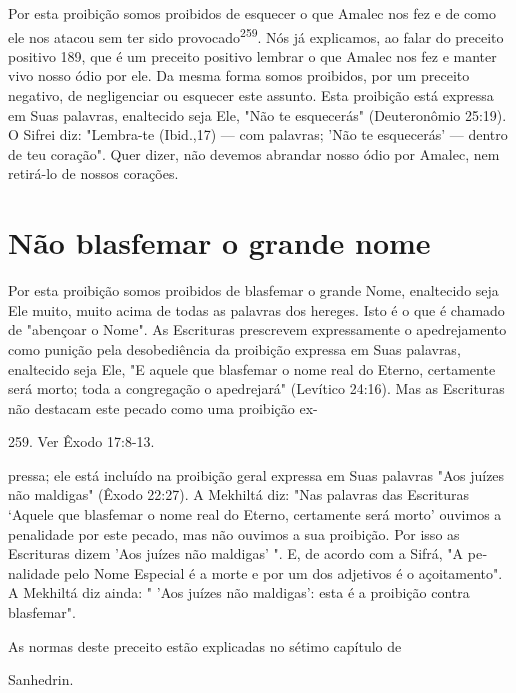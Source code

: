 \begin{itemize}
\begin{enumrate}
\begin{itemize}
\begin{itemize}
\begin{itemize}
Por esta proibição somos proibidos de esquecer o que Amalec nos fez e de
como ele nos atacou sem ter sido provocado\textsuperscript{259}. Nós já
explicamos, ao falar do preceito positivo 189, que é um preceito
positivo lembrar o que Amalec nos fez e manter vivo nosso ódio por ele.
Da mesma forma somos proi­bidos, por um preceito negativo, de
negligenciar ou esquecer este assunto. Es­ta proibição está expressa em
Suas palavras, enaltecido seja Ele, "Não te esque­cerás" (Deuteronômio
25:19). O Sifrei diz: "Lembra-te (Ibid.,17) --- com pala­vras; 'Não te
esquecerás' --- dentro de teu coração". Quer dizer, não devemos abrandar
nosso ódio por Amalec, nem retirá-lo de nossos corações.


\section{Não blasfemar o grande nome}


Por esta proibição somos proibidos de blasfemar o grande Nome,
enaltecido seja Ele muito, muito acima de todas as palavras dos hereges.
Isto é o que é chamado de "abençoar o Nome". As Escrituras prescrevem
expressa­mente o apedrejamento como punição pela desobediência da
proibição expressa em Suas palavras, enaltecido seja Ele, "E aquele que
blasfemar o nome real do Eterno, certamente será morto; toda a
congregação o apedrejará" (Levítico 24:16). Mas as Escrituras não
destacam este pecado como uma proibição ex-

259. Ver Êxodo 17:8-13.

pressa; ele está incluído na proibição geral expressa em Suas palavras
"Aos juí­zes não maldigas" (Êxodo 22:27). A Mekhiltá diz: "Nas palavras
das Escrituras `Aquele que blasfemar o nome real do Eterno, certamente
será morto' ouvimos a penalidade por este pecado, mas não ouvimos a sua
proibição. Por isso as Escrituras dizem 'Aos juízes não maldigas' ". E,
de acordo com a Sifrá, "A pe­nalidade pelo Nome Especial é a morte e por
um dos adjetivos é o açoitamen­to". A Mekhiltá diz ainda: " 'Aos juízes
não maldigas': esta é a proibição contra blasfemar".


As normas deste preceito estão explicadas no sétimo capítulo de


Sanhedrin.


\end{itemize}
\end{itemize}
\end{itemize}
\end{enumrate}
\end{itemize}
